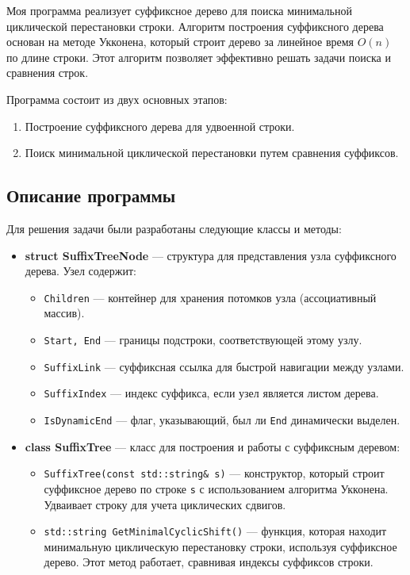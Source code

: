 \documentclass[12pt]{article}
\begin{document}
Моя программа реализует суффиксное дерево для поиска минимальной циклической перестановки строки. Алгоритм построения суффиксного дерева основан на методе Укконена, который строит дерево за линейное время $O(n)$ по длине строки. Этот алгоритм позволяет эффективно решать задачи поиска и сравнения строк.

Программа состоит из двух основных этапов:
\begin{enumerate}
    \item Построение суффиксного дерева для удвоенной строки.
    \item Поиск минимальной циклической перестановки путем сравнения суффиксов.
\end{enumerate}

\subsection*{Описание программы}

Для решения задачи были разработаны следующие классы и методы:

\begin{itemize}
    \item \textbf{struct SuffixTreeNode} — структура для представления узла суффиксного дерева. Узел содержит:
        \begin{itemize}
            \item \texttt{Children} — контейнер для хранения потомков узла (ассоциативный массив).
            \item \texttt{Start, End} — границы подстроки, соответствующей этому узлу.
            \item \texttt{SuffixLink} — суффиксная ссылка для быстрой навигации между узлами.
            \item \texttt{SuffixIndex} — индекс суффикса, если узел является листом дерева.
            \item \texttt{IsDynamicEnd} — флаг, указывающий, был ли \texttt{End} динамически выделен.
        \end{itemize}
    
    \item \textbf{class SuffixTree} — класс для построения и работы с суффиксным деревом:
        \begin{itemize}
            \item \texttt{SuffixTree(const std::string\& s)} — конструктор, который строит суффиксное дерево по строке \texttt{s} с использованием алгоритма Укконена. Удваивает строку для учета циклических сдвигов.
            \item \texttt{std::string GetMinimalCyclicShift()} — функция, которая находит минимальную циклическую перестановку строки, используя суффиксное дерево. Этот метод работает, сравнивая индексы суффиксов строки.
        \end{itemize}
\end{itemize}
\end{document}
